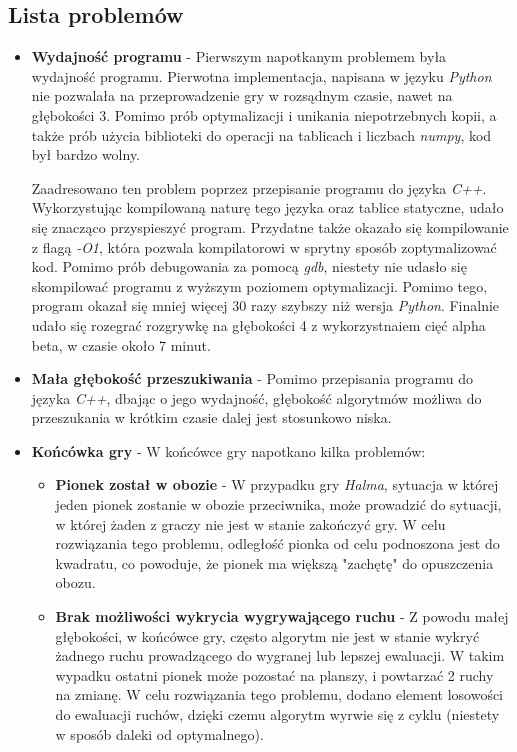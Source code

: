 \documentclass[a4paper, 12pt]{article}
\begin{document}
\subsection{Lista problemów}
\begin{itemize}
    \item \textbf{Wydajność programu} - Pierwszym napotkanym problemem była wydajność programu. 
Pierwotna implementacja, napisana w języku \textit{Python} nie pozwalała 
na przeprowadzenie gry w rozsądnym czasie, nawet na głębokości 3. Pomimo 
prób optymalizacji i unikania niepotrzebnych kopii, a także prób 
użycia biblioteki do operacji na tablicach i liczbach \textit{numpy}, kod był bardzo
wolny.

Zaadresowano ten problem poprzez przepisanie programu do języka \textit{C++}. 
Wykorzystując kompilowaną naturę tego języka oraz 
tablice statyczne, udało się znacząco przyspieszyć program. Przydatne także okazało się 
kompilowanie z flagą \textit{-O1}, która pozwala kompilatorowi w sprytny sposób zoptymalizować
kod. Pomimo prób debugowania za pomocą \textit{gdb}, niestety nie udasło się 
skompilować programu z wyższym poziomem optymalizacji. Pomimo tego, 
program okazał się mniej więcej 30 razy szybszy niż wersja \textit{Python}. Finalnie udało
się rozegrać rozgrywkę na głębokości 4 z wykorzystnaiem cięć alpha beta, w czasie około 7 minut.

    \item \textbf{Mała głębokość przeszukiwania} - Pomimo przepisania programu do języka \textit{C++},
dbając o jego wydajność, głębokość algorytmów możliwa do przeszukania w krótkim czasie dalej jest 
stosunkowo niska. 


    \item \textbf{Końcówka gry} - W końcówce gry napotkano kilka problemów:
    \begin{itemize}
        \item \textbf{Pionek został w obozie} - W przypadku gry \textit{Halma},
        sytuacja w której jeden pionek zostanie w obozie przeciwnika,
        może prowadzić do sytuacji, w której żaden z graczy nie jest w stanie
        zakończyć gry. W celu rozwiązania tego problemu, odległość 
        pionka od celu podnoszona jest do kwadratu, co powoduje, że
        pionek ma większą "zachętę" do opuszczenia obozu.
        \item \textbf{Brak możliwości wykrycia wygrywającego ruchu} - Z powodu małej głębokości,
        w końcówce gry, często algorytm nie jest w stanie wykryć żadnego ruchu prowadzącego
        do wygranej lub lepszej ewaluacji. W takim wypadku ostatni pionek może pozostać
        na planszy, i powtarzać 2 ruchy na zmianę. W celu rozwiązania tego problemu,
        dodano element losowości do ewaluacji ruchów, dzięki czemu algorytm wyrwie się z cyklu (niestety
        w sposób daleki od optymalnego).
    \end{itemize}

\end{itemize}
\end{document}
